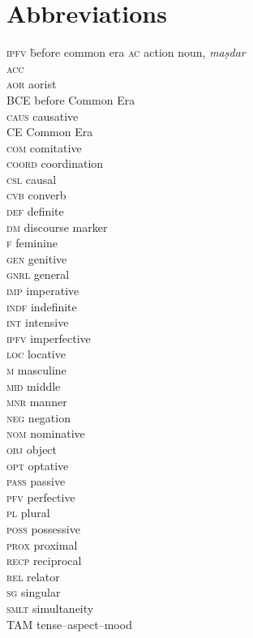 \documentclass[output=paper]{langsci/langscibook}
\begin{document}
\section*{Abbreviations}
\begin{multicols}{2}
\begin{tabbing}
\textsc{ipfv} \hspace{1em} \= before common era\kill
\textsc{ac} \> action noun, \textit{maṣdar} \\
\textsc{acc} \\
\textsc{aor} \> aorist \\
BCE \> before Common Era \\
\textsc{caus} \> {{causative} } \\
CE \> Common Era \\
\textsc{com} \> {{comitative} }\\
\textsc{coord} \> {{coordination} }\\
\textsc{csl} \> {{causal} }\\
\textsc{cvb} \> {{converb} }\\
\textsc{def} \> {{definite} }\\
\textsc{dm} \> {{discourse marker}} \\
\textsc{f} \> {{feminine} }\\
\textsc{gen} \> genitive \\
\textsc{gnrl} \> {{general} }\\
\textsc{imp} \> {{imperative} }\\
\textsc{indf} \> {{indefinite} }\\
\textsc{int} \> {{intensive} }\\
\textsc{ipfv} \> {{imperfective} }\\
\textsc{loc} \> {{locative} }\\
\textsc{m} \> {{masculine} }\\
\textsc{mid} \> {{middle}}\\
\textsc{mnr} \> {{manner} }\\
\textsc{neg} \> {{negation} }\\
\textsc{nom} \> {{nominative} }\\
\textsc{obj} \> {{object} }\\
\textsc{opt} \> {{optative} }\\
\textsc{pass} \> {{passive} }\\
\textsc{pfv} \> {{perfective} }\\
\textsc{pl} \> plural \\
\textsc{poss} \> {{possessive} }\\
\textsc{prox} \> {{proximal} }\\
\textsc{recp} \> {{reciprocal}}\\
\textsc{rel} \> {{relator} }\\
\textsc{sg} \> {{singular} } \\
\textsc{smlt} \> {{simultaneity}} \\
TAM \> {{tense--aspect--mood}}
\end{tabbing}
\end{multicols}




\sloppy
\printbibliography[heading=subbibliography,notkeyword=this]
\end{document}
